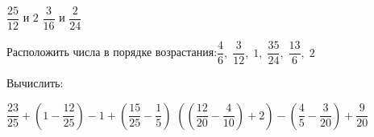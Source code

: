 \begin{class}[number=3]
\begin{listofex}
\begin{tasks}
		\task \( \dfrac{25}{12} \) и \( 2 \)
		\task \( \dfrac{3}{16} \) и \( \dfrac{2}{24} \)
	\end{tasks}
	\item Расположить числа в порядке возрастания:\quad\( \dfrac{4}{6},\;\dfrac{3}{12},\;1,\;\dfrac{35}{24},\;\dfrac{13}{6},\;2 \)
	\item Вычислить:
	\begin{tasks}
		\task \( \dfrac{23}{25}+\left( 1-\dfrac{12}{25} \right)-1+\left( \dfrac{15}{25}-\dfrac{1}{5} \right) \)
		\task \( \left( \left( \dfrac{12}{20}-\dfrac{4}{10} \right) + 2\right)-\left( \dfrac{4}{5}-\dfrac{3}{20} \right)+\dfrac{9}{20} \)
	\end{tasks}
	\end{listofex}
\end{class}

